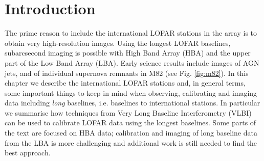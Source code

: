 \documentclass[graybox]{svmult}
\begin{document}

\section{Introduction}
\label{sec:introduction}

The prime reason to include the international LOFAR stations in the array is to
obtain very high-resolution images.  Using the longest LOFAR baselines,
subarcsecond imaging is possible with High Band Array (HBA) and the upper part
of the Low Band Array (LBA). Early science results include images of AGN jets,
and of individual supernova remnants in M82 (see Fig. \ref{fig:m82}).  In this
chapter we describe the international LOFAR stations and, in general terms,
some important things to keep in mind when observing, calibrating and imaging
data including \emph{long} baselines, i.e.  baselines to international
stations.  In particular we summarise how techniques from Very Long Baseline
Interferometry (VLBI) can be used to calibrate LOFAR data using the longest
baselines. Some parts of the text are focused on HBA data; calibration and
imaging of long baseline data from the LBA is more challenging and additional
work is still needed to find the best approach. 
\end{document}
